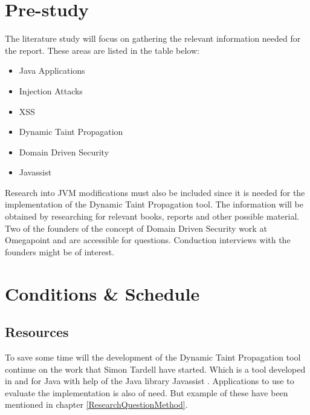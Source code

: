 \documentclass{../kththesis}
\begin{document}
\chapter{Pre-study} \label{Pre-study}
The literature study will focus on gathering the relevant information needed for the report. These areas are listed in the table below:
	
	\begin{itemize}  
		\item Java Applications
		\item Injection Attacks
		\item XSS
		\item Dynamic Taint Propagation
		\item Domain Driven Security
		\item Javassist
	\end{itemize}

\noindent
Research into JVM modifications must also be included since it is needed for the implementation of the Dynamic Taint Propagation tool. The information will be obtained by researching for relevant books, reports and other possible material. Two of the founders of the concept of Domain Driven Security work at Omegapoint and are accessible for questions. Conduction interviews with the founders might be of interest.



\chapter{Conditions \& Schedule}
\section{Resources}
To save some time will the development of the Dynamic Taint Propagation tool continue on the work that Simon Tardell have started. Which is a tool developed in and for Java with help of the Java library Javassist \parencite{Javassist}. Applications to use to evaluate the implementation is also of need. But example of these have been mentioned in chapter \ref{ResearchQuestionMethod}.
\end{document}
